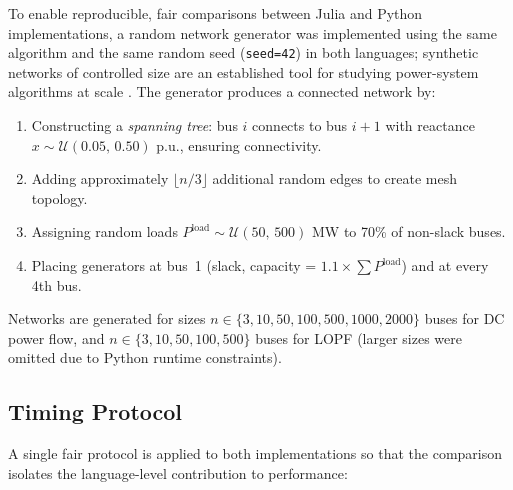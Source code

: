 To enable reproducible, fair comparisons between Julia and Python implementations, a random network generator was implemented using the same algorithm and the same random seed (\texttt{seed=42}) in both languages; synthetic networks of controlled size are an established tool for studying power-system algorithms at scale \cite{birchfield2017grid}. The generator produces a connected network by:

\begin{enumerate}
    \item Constructing a \emph{spanning tree}: bus $i$ connects to bus $i+1$ with reactance $x \sim \mathcal{U}(0.05,\, 0.50)$ p.u., ensuring connectivity.
    \item Adding approximately $\lfloor n/3 \rfloor$ additional random edges to create mesh topology.
    \item Assigning random loads $P^\text{load} \sim \mathcal{U}(50,\, 500)$ MW to 70\% of non-slack buses.
    \item Placing generators at bus~1 (slack, capacity = $1.1 \times \sum P^\text{load}$) and at every 4th bus.
\end{enumerate}

Networks are generated for sizes $n \in \{3, 10, 50, 100, 500, 1000, 2000\}$ buses for DC power flow, and $n \in \{3, 10, 50, 100, 500\}$ buses for LOPF (larger sizes were omitted due to Python runtime constraints).

\subsection{Timing Protocol}

A single fair protocol is applied to both implementations so that the comparison isolates the language-level contribution to performance:

